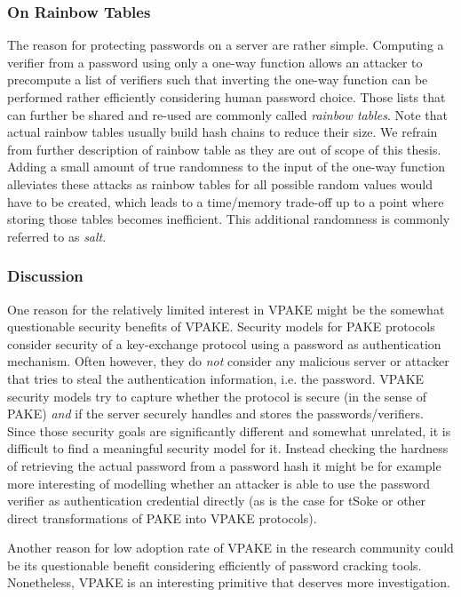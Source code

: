 \subsubsection{On Rainbow Tables}
The reason for protecting passwords on a server are rather simple.
Computing a verifier from a password using only a one-way function allows an attacker to precompute a list of verifiers such that inverting the one-way function can be performed rather efficiently considering human password choice.
Those lists that can further be shared and re-used are commonly called \emph{rainbow tables}.
Note that actual rainbow tables usually build hash chains to reduce their size.
We refrain from further description of rainbow table as they are out of scope of this thesis.
Adding a small amount of true randomness to the input of the one-way function alleviates these attacks as rainbow tables for all possible random values would have to be created, which leads to a time/memory trade-off up to a point where storing those tables becomes inefficient.
This additional randomness is commonly referred to as \emph{salt}.

\subsubsection{Discussion}\label{sec:intro:vpake-discusion}
One reason for the relatively limited interest in \acl{VPAKE} might be the somewhat questionable security benefits of \ac{VPAKE}.
Security models for \ac{PAKE} protocols consider security of a key-exchange protocol using a password as authentication mechanism.
Often however, they do \emph{not} consider any malicious server or attacker that tries to steal the authentication information, i.e. the password.
\ac{VPAKE} security models try to capture whether the protocol is secure (in the sense of \acl{PAKE}) \emph{and} if the server securely handles and stores the passwords/verifiers.
Since those security goals are significantly different and somewhat unrelated, it is difficult to find a meaningful security model for it.
Instead checking the hardness of retrieving the actual password from a password hash it might be for example more interesting of modelling whether an attacker is able to use the password verifier as authentication credential directly (as is the case for tSoke or other direct transformations of \ac{PAKE} into \ac{VPAKE} protocols).

Another reason for low adoption rate of \ac{VPAKE} in the research community could be its questionable benefit considering efficiently of password cracking tools.
Nonetheless, \ac{VPAKE} is an interesting primitive that deserves more investigation.


